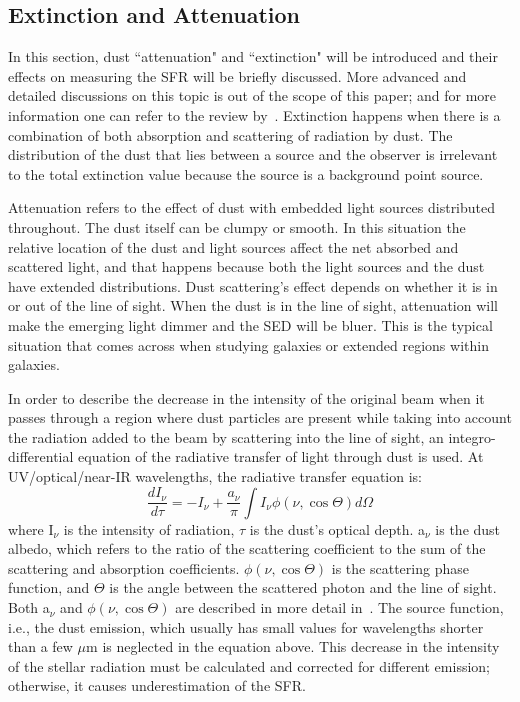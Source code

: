 \subsection{Extinction and Attenuation}
\label{sec: extinction}
In this section, dust ``attenuation" and ``extinction" will be introduced and their effects on measuring the SFR will be briefly discussed.
More advanced and detailed discussions on this topic is out of the scope of this paper; and for more information one can refer to the review by~\citep{Calzetti01}. 
Extinction happens when there is a combination of both absorption and scattering of radiation by dust. The distribution of the dust that lies between a source and the observer is irrelevant to the total extinction value because the source is a background point source.

Attenuation refers to the effect of dust with embedded light sources distributed throughout. 
The dust itself can be clumpy or smooth\citep{Calzetti13}. 
In this situation the relative location of the dust and light sources affect the net absorbed and scattered light, and that happens because both the light sources and the dust have extended distributions. 
Dust scattering's effect depends on whether it is in or out of the line of sight. 
When the dust is in the line of sight, attenuation will make the emerging light dimmer and the SED will be bluer. 
This is the typical situation that comes across when studying galaxies or extended regions within galaxies.

In order to describe the decrease in the intensity of the original beam when it passes through a region where dust particles are present while taking into account the radiation added to the beam by scattering into the line of sight, an integro-differential equation of the radiative transfer of light through dust is used. 
At UV/optical/near-IR wavelengths, the radiative transfer equation is:
\begin{equation}
\frac{dI_{\nu}}{d\tau} = -I_{\nu}  + \frac{a_{\nu}}{\pi} \int I_{\nu}\phi(\nu,\cos \Theta)d\Omega
\end{equation}
where I$_{\nu}$ is the intensity of radiation, $\tau$ is the dust's optical depth.
a$_{\nu}$ is the dust albedo, which refers to the ratio of the scattering coefficient to the sum of the scattering and absorption coefficients. 
$\phi(\nu,\cos \Theta)$ is the scattering phase function, and $\Theta$ is the angle between the scattered photon and the line of sight. 
Both a$_{\nu}$ and $\phi(\nu,\cos \Theta)$ are described in more detail in~\citep{Draine03}. 
The source function, i.e., the dust emission, which usually has small values for wavelengths shorter than a few $\mu$m is neglected in the equation above. 
This decrease in the intensity of the stellar radiation must be calculated and corrected for different emission; otherwise, it causes underestimation of the SFR. 

